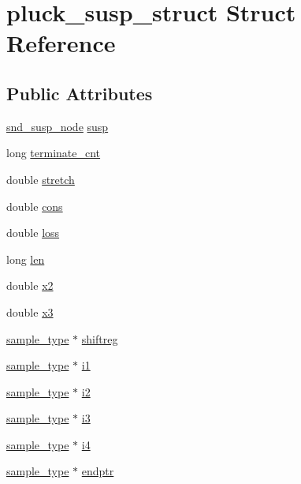 \hypertarget{structpluck__susp__struct}{}\section{pluck\+\_\+susp\+\_\+struct Struct Reference}
\label{structpluck__susp__struct}
\subsection*{Public Attributes}
\begin{DoxyCompactItemize}
\item 
\hyperlink{sound_8h_a6b268203688a934bd798ceb55f85d4c0}{snd\+\_\+susp\+\_\+node} \hyperlink{structpluck__susp__struct_a0bf0187ba222ad63316166614b8370c5}{susp}
\item 
long \hyperlink{structpluck__susp__struct_a6bbc830c3e3ab1482f5598c29593953b}{terminate\+\_\+cnt}
\item 
double \hyperlink{structpluck__susp__struct_aa168cd3a305b26ad68c8b214c9f0a11f}{stretch}
\item 
double \hyperlink{structpluck__susp__struct_aa8bc9f8b2bd88c556f47661fe5073a5d}{cons}
\item 
double \hyperlink{structpluck__susp__struct_a684f13eeaed04cd7428a8bcd6f1b9fa8}{loss}
\item 
long \hyperlink{structpluck__susp__struct_a83043371b4d760e9d17704949d5fe89d}{len}
\item 
double \hyperlink{structpluck__susp__struct_ada8da23b1a57c20975b6a4ab486ccbfa}{x2}
\item 
double \hyperlink{structpluck__susp__struct_a6c2f8a8b2cae4777e0c39d5f737f8412}{x3}
\item 
\hyperlink{sound_8h_a3a9d1d4a1c153390d2401a6e9f71b32c}{sample\+\_\+type} $\ast$ \hyperlink{structpluck__susp__struct_a963ca97fda5c61c72337cef49b6ff282}{shiftreg}
\item 
\hyperlink{sound_8h_a3a9d1d4a1c153390d2401a6e9f71b32c}{sample\+\_\+type} $\ast$ \hyperlink{structpluck__susp__struct_ac69bf68ba023bd9c52566e426945143c}{i1}
\item 
\hyperlink{sound_8h_a3a9d1d4a1c153390d2401a6e9f71b32c}{sample\+\_\+type} $\ast$ \hyperlink{structpluck__susp__struct_ace9701b6a6c10deee0bbf860b1ebd646}{i2}
\item 
\hyperlink{sound_8h_a3a9d1d4a1c153390d2401a6e9f71b32c}{sample\+\_\+type} $\ast$ \hyperlink{structpluck__susp__struct_aeff941aeb6f0a4191b5569e129ad50f0}{i3}
\item 
\hyperlink{sound_8h_a3a9d1d4a1c153390d2401a6e9f71b32c}{sample\+\_\+type} $\ast$ \hyperlink{structpluck__susp__struct_a8616f1ce208fcfdc23cc0153173bc940}{i4}
\item 
\hyperlink{sound_8h_a3a9d1d4a1c153390d2401a6e9f71b32c}{sample\+\_\+type} $\ast$ \hyperlink{structpluck__susp__struct_afcee2cca761957cf0aa2a86c52b9bcf6}{endptr}
\end{DoxyCompactItemize}


